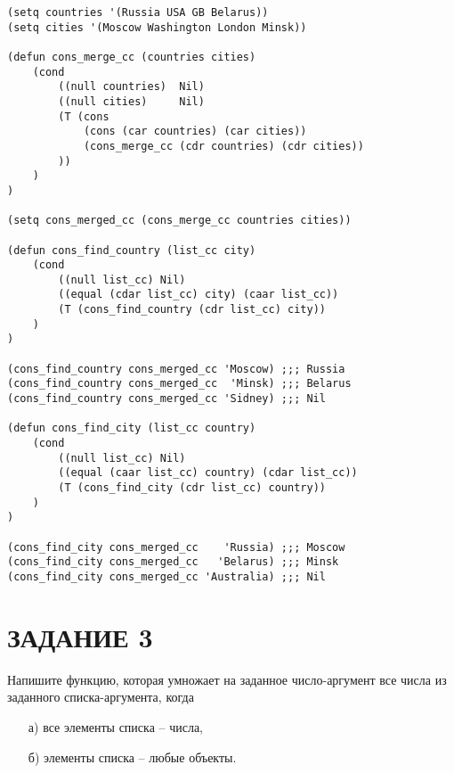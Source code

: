 \begin{lstlisting}
(setq countries '(Russia USA GB Belarus))
(setq cities '(Moscow Washington London Minsk))

(defun cons_merge_cc (countries cities)
    (cond
        ((null countries)  Nil)
        ((null cities)     Nil)
        (T (cons
            (cons (car countries) (car cities))
            (cons_merge_cc (cdr countries) (cdr cities))
        ))
    )
)

(setq cons_merged_cc (cons_merge_cc countries cities))

(defun cons_find_country (list_cc city)
    (cond
        ((null list_cc) Nil)
        ((equal (cdar list_cc) city) (caar list_cc))
        (T (cons_find_country (cdr list_cc) city))
    )
)

(cons_find_country cons_merged_cc 'Moscow) ;;; Russia
(cons_find_country cons_merged_cc  'Minsk) ;;; Belarus
(cons_find_country cons_merged_cc 'Sidney) ;;; Nil

(defun cons_find_city (list_cc country)
    (cond
        ((null list_cc) Nil)
        ((equal (caar list_cc) country) (cdar list_cc))
        (T (cons_find_city (cdr list_cc) country))
    )
)

(cons_find_city cons_merged_cc    'Russia) ;;; Moscow
(cons_find_city cons_merged_cc   'Belarus) ;;; Minsk
(cons_find_city cons_merged_cc 'Australia) ;;; Nil
\end{lstlisting}

\section{ЗАДАНИЕ 3}

Напишите функцию, которая умножает на заданное число-аргумент
все числа из заданного списка-аргумента, когда

\begin{enumerate}
    \item[а)] все элементы списка -- числа,
    \item[б)] элементы списка -- любые объекты.
\end{enumerate}

